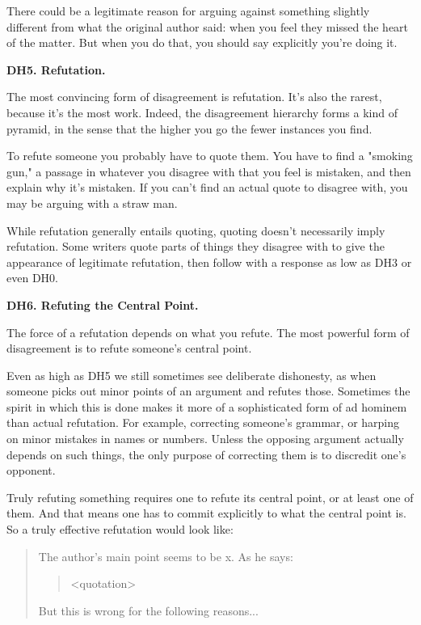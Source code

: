 There could be a legitimate reason for arguing
                  against something slightly different from what the original
                  author said: when you feel they missed the heart of the
                  matter. But when you do that, you should say explicitly you're
                  doing it.

\textbf{DH5. Refutation.}

The
                  most convincing form of disagreement is refutation. It's also
                  the rarest, because it's the most work. Indeed, the
                  disagreement hierarchy forms a kind of pyramid, in the sense
                  that the higher you go the fewer instances you find.

To
                  refute someone you probably have to quote them. You have to
                  find a "smoking gun," a passage in whatever you disagree with
                  that you feel is mistaken, and then explain why it's mistaken.
                  If you can't find an actual quote to disagree with, you may be
                  arguing with a straw man.

While refutation
                  generally entails quoting, quoting doesn't necessarily imply
                  refutation. Some writers quote parts of things they disagree
                  with to give the appearance of legitimate refutation, then
                  follow with a response as low as DH3 or even DH0.

\textbf{DH6. Refuting the Central Point.}

The force of a refutation depends on what you
                  refute. The most powerful form of disagreement is to refute
                  someone's central point.

Even as high as DH5 we
                  still sometimes see deliberate dishonesty, as when someone
                  picks out minor points of an argument and refutes those.
                  Sometimes the spirit in which this is done makes it more of a
                  sophisticated form of ad hominem than actual refutation. For
                  example, correcting someone's grammar, or harping on minor
                  mistakes in names or numbers. Unless the opposing argument
                  actually depends on such things, the only purpose of
                  correcting them is to discredit one's opponent.

Truly
                  refuting something requires one to refute its central point,
                  or at least one of them. And that means one has to commit
                  explicitly to what the central point is. So a truly effective
                  refutation would look like:
                  \begin{quote}

                    The author's main point seems to be x. As he says:
                    \begin{quote}
<quotation>
\end{quote}

                    But this is wrong for the following reasons...
                  
\end{quote}

